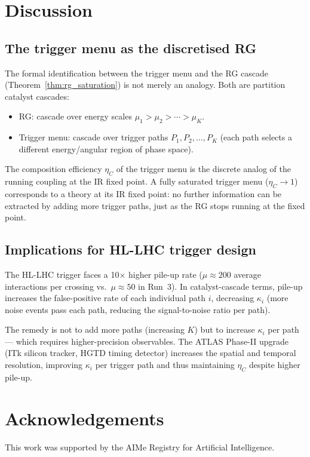 \documentclass[twocolumn,10pt,a4paper]{article}
\theoremstyle{thmstyle}
\theoremstyle{definition}
\theoremstyle{remark}
\newcommand{\catpow}{\kappa}
\newcommand{\etaC}{\eta_{C}}
\begin{document}
\section{Discussion}
\label{sec:disc}

\subsection{The trigger menu as the discretised RG}

The formal identification between the trigger menu and the RG cascade
(Theorem~\ref{thm:rg_saturation}) is not merely an analogy. Both are
partition catalyst cascades:
\begin{itemize}[nosep]
\item RG: cascade over energy scales $\mu_1 > \mu_2 > \cdots > \mu_K$.
\item Trigger menu: cascade over trigger paths $P_1, P_2, \ldots, P_K$
(each path selects a different energy/angular region of phase space).
\end{itemize}
The composition efficiency $\etaC$ of the trigger menu is the discrete
analog of the running coupling at the IR fixed point.
A fully saturated trigger menu ($\etaC \to 1$) corresponds to a theory at
its IR fixed point: no further information can be extracted by adding
more trigger paths, just as the RG stops running at the fixed point.

\subsection{Implications for HL-LHC trigger design}

The HL-LHC trigger faces a 10$\times$ higher pile-up rate
($\mu \approx 200$ average interactions per crossing vs.\ $\mu \approx 50$
in Run~3). In catalyst-cascade terms, pile-up increases the false-positive
rate of each individual path $i$, decreasing $\catpow_i$ (more noise events
pass each path, reducing the signal-to-noise ratio per path).

The remedy is not to add more paths (increasing $K$) but to increase
$\catpow_i$ per path — which requires higher-precision observables.
The ATLAS Phase-II upgrade (ITk silicon tracker, HGTD timing detector)
increases the spatial and temporal resolution, improving $\catpow_i$
per trigger path and thus maintaining $\etaC$ despite higher pile-up.

\section*{Acknowledgements}
This work was supported by the AIMe Registry for Artificial Intelligence.



\end{document}
